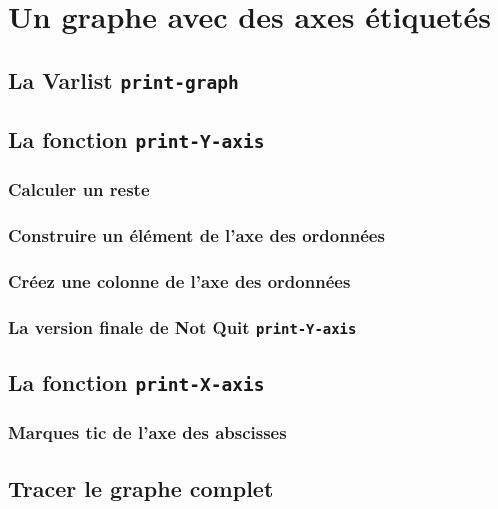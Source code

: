 \chapter{Un graphe avec des axes étiquetés}

\section{La Varlist \texttt{print-graph}}

 \section{La fonction \texttt{print-Y-axis}}

 \subsection{Calculer un reste}

\subsection{Construire un élément de l'axe des
  ordonnées}

  \subsection{Créez une colonne de l'axe des ordonnées}

\subsection{La version finale de Not Quit
  \texttt{print-Y-axis}}

  \section{La fonction \texttt{print-X-axis}}

 \subsection{Marques tic de l'axe des abscisses}

 \section{Tracer le graphe complet}

